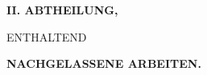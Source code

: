 \documentclass[11pt]{article}
\begin{document}
\thispagestyle{empty}
\vspace*{0.35\textheight}
\begin{center}
{\Large \textbf{II. ABTHEILUNG,}}\par\vspace{1.2em}
{\large ENTHALTEND}\par\vspace{1.2em}
{\Large \textbf{NACHGELASSENE ARBEITEN.}}
\end{center}
\end{document}
